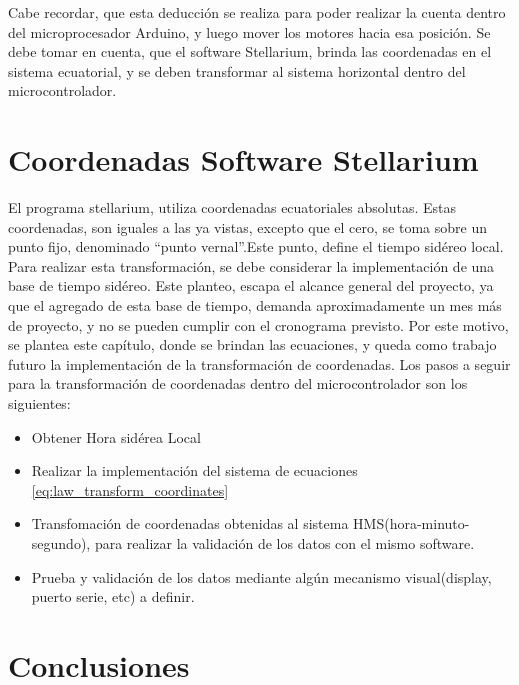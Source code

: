 Cabe recordar, que esta deducción se realiza para poder realizar la cuenta dentro del microprocesador Arduino, y luego mover los motores hacia esa posición. Se debe tomar en cuenta, que el software Stellarium, brinda las coordenadas en el sistema ecuatorial, y se deben transformar al sistema horizontal dentro del microcontrolador. 

\section{Coordenadas Software Stellarium}

El programa stellarium, utiliza coordenadas ecuatoriales absolutas. Estas coordenadas, son iguales a las ya vistas, excepto que el cero, se toma sobre un punto fijo, denominado ``punto vernal''.Este punto, define el tiempo sidéreo local. Para realizar esta transformación, se debe considerar la implementación de una base de tiempo sidéreo. Este planteo, escapa el alcance general del proyecto, ya que el agregado de esta base de tiempo, demanda aproximadamente un mes más de proyecto, y no se pueden cumplir con el cronograma previsto. Por este motivo, se plantea este capítulo, donde se brindan las ecuaciones, y queda como trabajo futuro la implementación de la transformación de coordenadas. Los pasos a seguir para la transformación de coordenadas dentro del microcontrolador son los siguientes: 
\begin{itemize}
	\item Obtener Hora sidérea Local 
	\item Realizar la implementación del sistema de ecuaciones \ref{eq:law_transform_coordinates}
	\item Transfomación de coordenadas obtenidas al sistema HMS(hora-minuto-segundo), para realizar la validación de los datos con el mismo software. 
	\item Prueba y validación de los datos mediante algún mecanismo visual(display, puerto serie, etc) a definir. 
\end{itemize} 

\section{Conclusiones}

